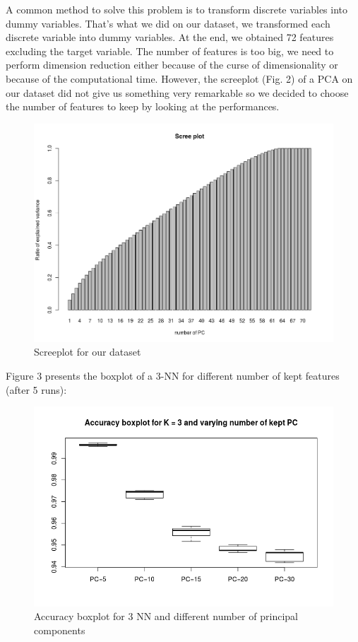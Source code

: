 \documentclass[11pt]{article}
\begin{document}
A common method to solve this problem is to transform discrete variables into dummy variables. That's what we did on our dataset, we transformed each discrete variable into dummy variables. At the end, we obtained 72 features excluding the target variable. The number of features is too big, we need to perform dimension reduction either because of the curse of dimensionality or because of the computational time. However, the screeplot (Fig. 2) of a PCA on our dataset did not give us something very remarkable so we decided to choose the number of features to keep by looking at the performances. 

\begin{figure}[!h]
\begin{center}
\includegraphics[scale=0.6]{images/screeplot.png}

\end{center}
\caption{Screeplot for our dataset}
\end{figure}
\newpage
Figure 3 presents the boxplot of a 3-NN for different number of kept features (after 5 runs): 

\begin{figure}[!h]
\begin{center}
\includegraphics[scale=0.8]{images/KNN_PCA.png}

\end{center}
\caption{Accuracy boxplot for 3 NN and different number of principal components}
\end{figure}
\end{document}
